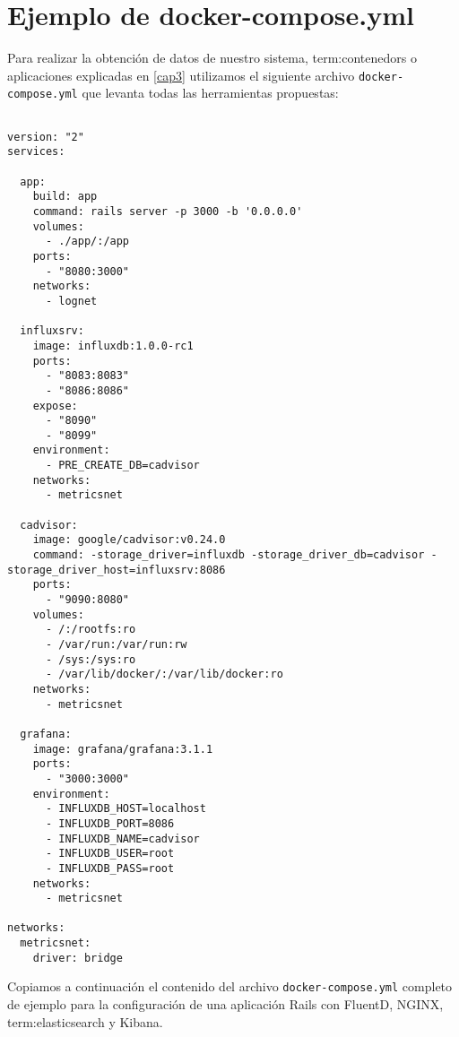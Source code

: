 \section{Ejemplo de docker-compose.yml}
\label{anexo:C}

Para realizar la obtención de datos de nuestro sistema, \glspl{term:contenedor} o
aplicaciones explicadas en \autoref{cap3} utilizamos el siguiente archivo
\texttt{docker-compose.yml} que levanta todas las herramientas propuestas:

\begin{lstlisting}

version: "2"
services:

  app:
    build: app
    command: rails server -p 3000 -b '0.0.0.0'
    volumes:
      - ./app/:/app
    ports:
      - "8080:3000"
    networks:
      - lognet

  influxsrv:
    image: influxdb:1.0.0-rc1
    ports:
      - "8083:8083"
      - "8086:8086"
    expose:
      - "8090"
      - "8099"
    environment:
      - PRE_CREATE_DB=cadvisor
    networks:
      - metricsnet

  cadvisor:
    image: google/cadvisor:v0.24.0
    command: -storage_driver=influxdb -storage_driver_db=cadvisor -storage_driver_host=influxsrv:8086
    ports:
      - "9090:8080"
    volumes:
      - /:/rootfs:ro
      - /var/run:/var/run:rw
      - /sys:/sys:ro
      - /var/lib/docker/:/var/lib/docker:ro
    networks:
      - metricsnet

  grafana:
    image: grafana/grafana:3.1.1
    ports:
      - "3000:3000"
    environment:
      - INFLUXDB_HOST=localhost
      - INFLUXDB_PORT=8086
      - INFLUXDB_NAME=cadvisor
      - INFLUXDB_USER=root
      - INFLUXDB_PASS=root
    networks:
      - metricsnet

networks:
  metricsnet:
    driver: bridge

\end{lstlisting}

Copiamos a continuación el contenido del archivo \texttt{docker-compose.yml}
completo de ejemplo para la configuración de una aplicación Rails con FluentD,
NGINX, \gls{term:elasticsearch} y Kibana.

